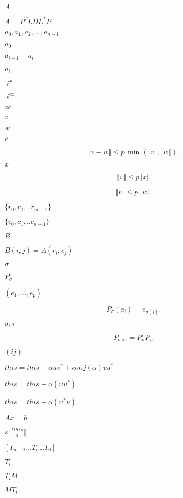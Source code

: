 \documentclass{article}
\begin{document}
$ A $
\pagebreak

$ A =  P^TLDL^*P $
\pagebreak

$ a_0, a_1, a_2, ..., a_{n-1}$
\pagebreak

$ a_0 $
\pagebreak

$ a_{i+1}-a_{i}$
\pagebreak

$ a_i $
\pagebreak

$ \ell^p $
\pagebreak

$ \ell^\infty $
\pagebreak

$\infty$
\pagebreak

$ v $
\pagebreak

$ w $
\pagebreak

$ p $
\pagebreak

\[ \Vert v - w \Vert \leqslant p\,\min(\Vert v\Vert, \Vert w\Vert). \]
\pagebreak

$ x $
\pagebreak

\[ \Vert v \Vert \leqslant p\,\vert x\vert. \]
\pagebreak

\[ \Vert v \Vert \leqslant p\,\Vert w\Vert. \]
\pagebreak

$ \{r_0,r_1,..r_{m-1}\} $
\pagebreak

$ \{c_0,c_1,..c_{n-1} \}$
\pagebreak

$ B $
\pagebreak

$ B(i,j) = A(r_i,c_j) $
\pagebreak

$ \sigma $
\pagebreak

$ P_\sigma $
\pagebreak

$ (e_1,\ldots,e_p) $
\pagebreak

\[ P_\sigma(e_i) = e_{\sigma(i)}. \]
\pagebreak

$ \sigma, \tau $
\pagebreak

\[ P_{\sigma\circ\tau} = P_\sigma P_\tau. \]
\pagebreak

$(ij)$
\pagebreak

$ this = this + \alpha u v^* + conj(\alpha) v u^* $
\pagebreak

$ this = this + \alpha ( u u^* ) $
\pagebreak

$ this = this + \alpha ( u^* u ) $
\pagebreak

$ A x = b $
\pagebreak

$ s \Vert \frac{*this}{s} \Vert $
\pagebreak

$[T_{n-1} \ldots T_{i} \ldots T_{0}]$
\pagebreak

$ T_{i} $
\pagebreak

$ T_{i} M$
\pagebreak

$ M T_{i}$
\pagebreak
\end{document}
